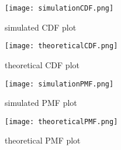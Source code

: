\documentclass[11pt,a4paper,twocolumn]{article}
\begin{document}
\begin{figure}[h!]
    \centering
    \texttt{[image: simulationCDF.png]}
    \caption{simulated CDF plot}
\end{figure}
\begin{figure}[h!]
    \centering
    \texttt{[image: theoreticalCDF.png]}
    \caption{theoretical CDF plot}
\end{figure}
\begin{figure}[h!]
    \centering
    \texttt{[image: simulationPMF.png]}
    \caption{simulated PMF plot}
\end{figure}
\begin{figure}[h!]
    \centering
    \texttt{[image: theoreticalPMF.png]}
    \caption{theoretical PMF plot }
\end{figure}
\end{document}
